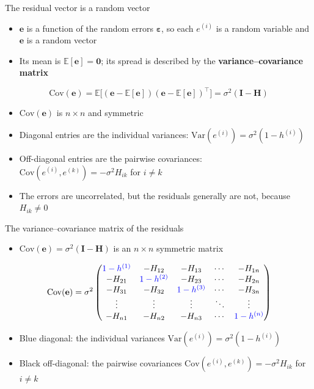 \begin{frame}{The residual vector is a random vector}
    \begin{itemize}
        \item $\mathbf{e}$ is a function of the random errors $\symbf{\varepsilon}$, so each $e^{(i)}$ is a random variable and $\mathbf{e}$ is a random vector
        \item Its mean is $\mathbb{E}[\mathbf{e}] = \mathbf{0}$; its spread is described by the \textbf{variance--covariance matrix}
    \end{itemize}
    \[
        \mathrm{Cov}(\mathbf{e}) = \mathbb{E}\big[(\mathbf{e} - \mathbb{E}[\mathbf{e}])(\mathbf{e} - \mathbb{E}[\mathbf{e}])^\top\big] = \sigma^2 (\mathbf{I} - \mathbf{H})
    \]
    \begin{itemize}
        \item $\mathrm{Cov}(\mathbf{e})$ is $n \times n$ and symmetric
        \item Diagonal entries are the individual variances: $\mathrm{Var}(e^{(i)}) = \sigma^2 (1 - h^{(i)})$
        \item Off-diagonal entries are the pairwise covariances: $\mathrm{Cov}(e^{(i)}, e^{(k)}) = -\sigma^2 H_{ik}$ for $i \neq k$
        \item The errors are uncorrelated, but the residuals generally are not, because $H_{ik} \neq 0$
    \end{itemize}
\end{frame}


\begin{frame}{The variance--covariance matrix of the residuals}
    \begin{itemize}
        \item $\mathrm{Cov}(\mathbf{e}) = \sigma^2(\mathbf{I} - \mathbf{H})$ is an $n \times n$ symmetric matrix
    \end{itemize}
    \[
        \mathrm{Cov}(\mathbf{e}) = \sigma^2 \begin{pmatrix}
            \textcolor{blue}{1 - h^{(1)}} & -H_{12} & -H_{13} & \cdots & -H_{1n} \\
            -H_{21} & \textcolor{blue}{1 - h^{(2)}} & -H_{23} & \cdots & -H_{2n} \\
            -H_{31} & -H_{32} & \textcolor{blue}{1 - h^{(3)}} & \cdots & -H_{3n} \\
            \vdots & \vdots & \vdots & \ddots & \vdots \\
            -H_{n1} & -H_{n2} & -H_{n3} & \cdots & \textcolor{blue}{1 - h^{(n)}}
        \end{pmatrix}
    \]
    \begin{itemize}
        \item Blue diagonal: the individual variances $\mathrm{Var}(e^{(i)}) = \sigma^2(1 - h^{(i)})$
        \item Black off-diagonal: the pairwise covariances $\mathrm{Cov}(e^{(i)}, e^{(k)}) = -\sigma^2 H_{ik}$ for $i \neq k$
    \end{itemize}
\end{frame}



